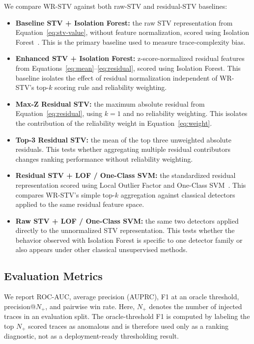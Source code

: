 \documentclass[informatics,article,submit,moreauthors]{Definitions/mdpi}
\begin{document}
We compare WR-STV against both raw-STV and residual-STV baselines:

\begin{itemize}
	\item \textbf{Baseline STV + Isolation Forest:} the raw STV
	representation from Equation~\ref{eq:stv-value}, without feature
	normalization, scored using Isolation Forest~\cite{liu2008iforest}.
	This is the primary baseline used to measure trace-complexity bias.

	\item \textbf{Enhanced STV + Isolation Forest:} z-score-normalized
	residual features from Equations~\ref{eq:mean}--\ref{eq:residual},
	scored using Isolation Forest. This baseline isolates the effect of
	residual normalization independent of WR-STV's top-\(k\) scoring
	rule and reliability weighting.

	\item \textbf{Max-Z Residual STV:} the maximum absolute residual from
	Equation~\ref{eq:residual}, using \(k=1\) and no reliability
	weighting. This isolates the contribution of the reliability weight
	in Equation~\ref{eq:weight}.

	\item \textbf{Top-3 Residual STV:} the mean of the top three
	unweighted absolute residuals. This tests whether aggregating
	multiple residual contributors changes ranking performance without
	reliability weighting.

	\item \textbf{Residual STV + LOF / One-Class SVM:} the standardized
	residual representation scored using Local Outlier Factor
	\cite{breunig2000lof} and One-Class SVM~\cite{scholkopf2001ocsvm}.
	This compares WR-STV's simple top-\(k\) aggregation against classical
	detectors applied to the same residual feature space.

	\item \textbf{Raw STV + LOF / One-Class SVM:} the same two detectors
	applied directly to the unnormalized STV representation. This tests
	whether the behavior observed with Isolation Forest is specific to
	one detector family or also appears under other classical
	unsupervised methods.
\end{itemize}

\subsection{Evaluation Metrics}

We report ROC-AUC, average precision (AUPRC), F1 at an oracle threshold,
precision@\(N_+\), and pairwise win rate. Here, \(N_+\) denotes the
number of injected traces in an evaluation split. The oracle-threshold
F1 is computed by labeling the top \(N_+\) scored traces as anomalous and
is therefore used only as a ranking diagnostic, not as a deployment-ready
thresholding result.
\end{document}
